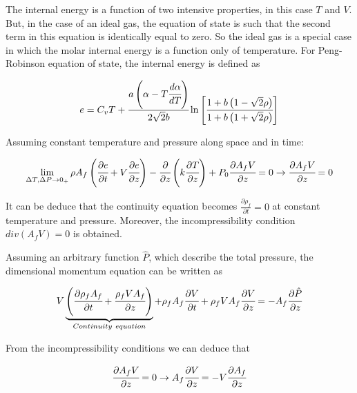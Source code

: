 \documentclass[../Article_Model_Parameters.tex]{subfiles}
\begin{document}
	The internal energy is a function of two intensive properties, in this case $T$ and $V$. But, in the case of an ideal gas, the equation of state is such that the second term in this equation is identically equal to zero. So the ideal gas is a special case in which the molar internal energy is a function only of temperature. For Peng-Robinson equation of state, the internal energy is defined as
	
	{\footnotesize
	\begin{equation*}
		e = C_vT + \cfrac{a\left(\alpha -T\cfrac{d \alpha}{dT}\right)}{2\sqrt{2}b} \ln \left[ \cfrac{1+b\left(1-\sqrt{2}\rho\right) }{1+b\left(1+\sqrt{2}\rho\right)} \right]
	\end{equation*} }
	
	Assuming constant temperature and pressure along space and in time:
	
	{\footnotesize
		\begin{equation*}
			\lim_{\Delta T, \Delta P \rightarrow 0_+ } \rho A_f \left( \cfrac{\partial e }{\partial t} + V \cfrac{\partial e}{\partial z} \right) - \cfrac{\partial}{\partial z} \left( k \cfrac{\partial T}{\partial z} \right) + P_0 \cfrac{\partial A_f V}{\partial z} = 0 \rightarrow \cfrac{\partial A_f V}{\partial z} = 0
		\end{equation*}
	}
	
	It can be deduce that the continuity equation becomes $\frac{\partial \rho_f}{\partial t} = 0$ at constant temperature and pressure. Moreover, the incompressibility condition $div(A_fV)=0$ is obtained.
	
	Assuming an arbitrary function $\hat{P}$, which describe the total pressure, the dimensional momentum equation can be written as
	
	{\footnotesize
		\begin{equation*}
			V \underbrace{ \left( \cfrac{\partial \rho_f A_f}{\partial t} + \cfrac{\rho_f V A_f}{\partial z} \right) }_{Continuity~equation} + \rho_f A_f \cfrac{\partial V}{\partial t} + \rho_f V A_f \cfrac{\partial V}{\partial z} = - A_f \cfrac{\partial \hat{P}}{\partial z}
		\end{equation*}
	}
	
	From the incompressibility conditions we can deduce that
	
	{\footnotesize
		\begin{equation*}
			\cfrac{\partial A_f V}{\partial z} = 0 \rightarrow A_f \cfrac{\partial V}{\partial z} = - V \cfrac{\partial A_f}{\partial z}
		\end{equation*}
	}
	
\end{document}
